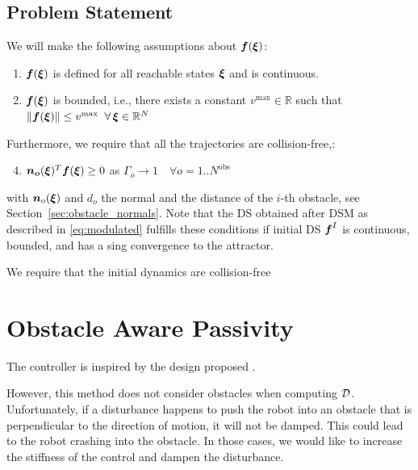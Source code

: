 \documentclass[conference]{IEEEtran}
\begin{document}
\subsection{Problem Statement}
We will make the following assumptions about $\boldsymbol{f}(\boldsymbol{\xi})$:
\begin{enumerate}
    \item $ \boldsymbol{f}(\boldsymbol{\xi})$ is defined for all reachable states $\boldsymbol{\xi}$ and is continuous.
    \item $\boldsymbol{f}(\boldsymbol{\xi})$ is bounded, i.e., there exists a constant $v^{\mathrm{max}} \in \mathbb{R}$ such that $\| \boldsymbol{f}(\boldsymbol{\xi}) \| \leq v^{\mathrm{max}} \;\; \forall \, \boldsymbol{\xi} \in \mathbb{R}^N$
\end{enumerate}

Furthermore, we require that all the trajectories are collision-free,: 
\begin{enumerate}
  \setcounter{enumi}{3}
  \item $\boldsymbol{n_o}(\boldsymbol{\xi})^T \boldsymbol{f}(\boldsymbol{\xi}) \geq 0$ as $\Gamma_o \rightarrow 1 
  \quad \forall o = 1 .. N^{\mathrm{obs}}$
\end{enumerate}
with $\boldsymbol{n}_o (\boldsymbol{\xi})$ and $d_o$ the normal and the distance of the $i$-th obstacle, see Section~\ref{sec:obstacle_normals}. 
Note that the DS obtained after DSM as described in \eqref{eq:modulated} fulfills these conditions if initial DS $\boldsymbol{f}^I$ is continuous, bounded, and has a sing convergence to the attractor.

We require that the initial dynamics are collision-free

\section{Obstacle Aware Passivity} \label{sec:obstacle_aware_passivity}
The controller is inspired by the design proposed \cite{kronander2015passive}.

However, this method does not consider obstacles when computing $\mathcal{D}$. Unfortunately, if a disturbance happens to push the robot into an obstacle that is perpendicular to the direction of motion, it will not be damped. This could lead to the robot crashing into the obstacle. In those cases, we would like to increase the stiffness of the control and dampen the disturbance.
\end{document}
